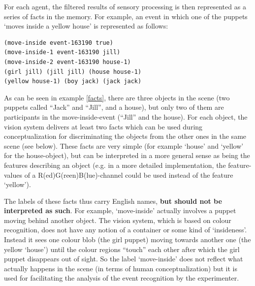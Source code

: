 For each agent, the filtered results of sensory processing is then represented as a series of facts in the memory. For example, an event in which one of the puppets `moves inside a yellow house' is represented as follows:

\ea
\label{facts}
\begin{lstlisting}
(move-inside event-163190 true)
(move-inside-1 event-163190 jill)
(move-inside-2 event-163190 house-1)
(girl jill) (jill jill) (house house-1) 
(yellow house-1) (boy jack) (jack jack)
\end{lstlisting}
\z

As can be seen in example \ref{facts}, there are three objects in the scene (two puppets called ``Jack'' and ``Jill'', and a house), but only two of them are participants in the move-inside-event (``Jill'' and the house). For each object, the vision system delivers at least two facts which can be used during conceptualization for discriminating the objects from the other ones in the same scene (see below). These facts are very simple (for example `house' and `yellow' for the house-object), but can be interpreted in a more general sense as being the features describing an object (e.g. in a more detailed implementation, the feature-values of a R(ed)G(reen)B(lue)-channel could be used instead of the feature `yellow').

The labels of these facts thus carry English names, {\bfseries but should not be interpreted as such}. For example, `move-inside' actually involves a puppet moving behind another object. The vision system, which is based on colour recognition, does not have any notion of a container or some kind of `insideness'. Instead it sees one colour blob (the girl puppet) moving towards another one (the yellow `house') until the colour regions ``touch'' each other after which the girl puppet disappears out of sight. So the label `move-inside' does not reflect what actually happens in the scene (in terms of human conceptualization) but it is used for facilitating the analysis of the event recognition by the experimenter.


